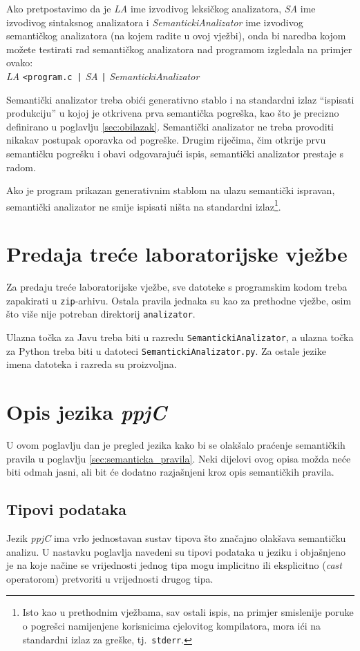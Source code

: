 \documentclass[times, 12pt, utf8]{book}
\begin{document}
Ako pretpostavimo da je \emph{LA} ime izvodivog leksičkog analizatora, \emph{SA} ime izvodivog sintaksnog analizatora i \emph{SemantickiAnalizator} ime izvodivog semantičkog analizatora (na kojem radite u ovoj vježbi), onda bi naredba kojom možete testirati rad semantičkog analizatora nad programom izgledala na primjer ovako:\\
\emph{LA} \verb#<program.c |# \emph{SA} \verb#|# \emph{SemantickiAnalizator}

Semantički analizator treba obići generativno stablo i na standardni izlaz ``ispisati produkciju'' u kojoj je otkrivena prva semantička pogreška, kao što je precizno definirano u poglavlju \ref{sec:obilazak}.
Semantički analizator ne treba provoditi nikakav postupak oporavka od pogreške.
Drugim riječima, čim otkrije prvu semantičku pogrešku i obavi odgovarajući ispis, semantički analizator prestaje s radom.

Ako je program prikazan generativnim stablom na ulazu semantički ispravan, semantički analizator ne smije ispisati ništa na standardni izlaz\footnote{Isto kao u prethodnim vježbama, sav ostali ispis, na primjer smislenije poruke o pogrešci namijenjene korisnicima cjelovitog kompilatora, mora ići na standardni izlaz za greške, tj.~\texttt{stderr}.}.


\section{Predaja treće laboratorijske vježbe}
Za predaju treće laboratorijske vježbe, sve datoteke s programskim kodom treba zapakirati u \verb|zip|-arhivu.
Ostala pravila jednaka su kao za prethodne vježbe, osim što više nije potreban direktorij \verb|analizator|.

Ulazna točka za Javu treba biti u razredu \verb|SemantickiAnalizator|, a ulazna točka za Python treba biti u datoteci \verb|SemantickiAnalizator.py|.
Za ostale jezike imena datoteka i razreda su proizvoljna.


\section{Opis jezika \emph{ppjC}}
U ovom poglavlju dan je pregled jezika kako bi se olakšalo praćenje semantičkih pravila u poglavlju \ref{sec:semanticka_pravila}.
Neki dijelovi ovog opisa možda neće biti odmah jasni, ali bit će dodatno razjašnjeni kroz opis semantičkih pravila.

\subsection{Tipovi podataka}
Jezik \emph{ppjC} ima vrlo jednostavan sustav tipova što značajno olakšava semantičku analizu.
U nastavku poglavlja navedeni su tipovi podataka u jeziku i objašnjeno je na koje načine se vrijednosti jednog tipa mogu implicitno ili eksplicitno (\emph{cast} operatorom) pretvoriti u vrijednosti drugog tipa.
\end{document}
